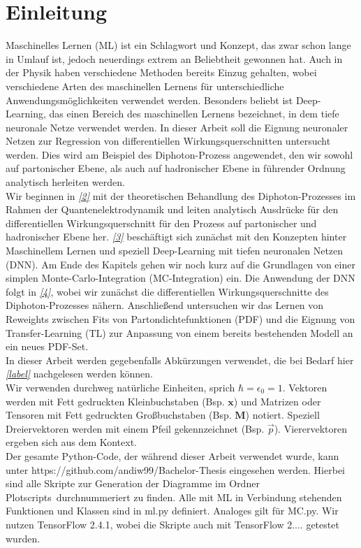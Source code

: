 \chapter{Einleitung}
Maschinelles Lernen (ML) ist ein Schlagwort und Konzept, das zwar schon lange in Umlauf ist, jedoch neuerdings extrem an Beliebtheit gewonnen hat. Auch in der Physik haben verschiedene Methoden bereits Einzug gehalten, wobei verschiedene Arten des maschinellen Lernens für unterschiedliche Anwendungsmöglichkeiten verwendet werden. Besonders beliebt ist Deep-Learning, das einen Bereich des maschinellen Lernens bezeichnet, in dem tiefe neuronale Netze verwendet werden. In dieser Arbeit soll die Eignung neuronaler Netzen zur Regression von differentiellen Wirkungsquerschnitten untersucht werden. Dies wird am Beispiel des Diphoton-Prozess angewendet, den wir sowohl auf partonischer Ebene, als auch auf hadronischer Ebene in führender Ordnung analytisch herleiten werden.\\
\newline
Wir beginnen in \textit{\autoref{2}} mit der theoretischen Behandlung des Diphoton-Prozesses im Rahmen der Quantenelektrodynamik und leiten analytisch Ausdrücke für den differentiellen Wirkungsquerschnitt für den Prozess auf partonischer und hadronischer Ebene her. \textit{\autoref{3}} beschäftigt sich zunächst mit den Konzepten hinter Maschinellem Lernen und speziell Deep-Learning mit tiefen neuronalen Netzen (DNN). Am Ende des Kapitels gehen wir noch kurz auf die Grundlagen von einer simplen Monte-Carlo-Integration (MC-Integration) ein. Die Anwendung der DNN folgt in \textit{\autoref{4}}, wobei wir zunächst die differentiellen Wirkungsquerschnitte des Diphoton-Prozesses nähern. Anschließend untersuchen wir das Lernen von Reweights zwischen Fits von Partondichtefunktionen (PDF) und die Eignung von Transfer-Learning (TL) zur Anpassung von einem bereits bestehenden Modell an ein neues PDF-Set. \\
\newline
In dieser Arbeit werden gegebenfalls Abkürzungen verwendet, die bei Bedarf hier \textit{\autoref{label}} nachgelesen werden können. \\
Wir verwenden durchweg natürliche Einheiten, sprich $\hbar = \epsilon_0 = 1$. Vektoren werden mit Fett gedruckten Kleinbuchstaben (Bsp. $\mathbf{x}$) und Matrizen oder Tensoren mit Fett gedruckten Großbuchstaben (Bsp. $\mathbf{M}$) notiert. Speziell Dreiervektoren werden mit einem Pfeil gekennzeichnet (Bsp. $\vec{p}$). Vierervektoren ergeben sich aus dem Kontext. \\
\newline
Der gesamte Python-Code, der während dieser Arbeit verwendet wurde, kann unter https://github.com/andiw99/Bachelor-Thesis eingesehen werden. Hierbei sind alle Skripte zur Generation der Diagramme im Ordner \glqq Plotscripts\grqq~durchnummeriert zu finden. Alle mit ML in Verbindung stehenden Funktionen und Klassen sind in ml.py definiert. Analoges gilt für MC.py. Wir nutzen TensorFlow 2.4.1, wobei die Skripte auch mit TensorFlow 2.... getestet wurden.

